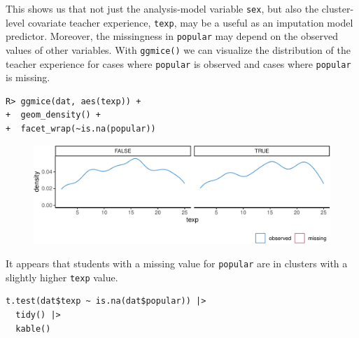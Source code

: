 \documentclass[
  article]{jss}
\begin{document}
This shows us that not just the analysis-model variable \texttt{sex},
but also the cluster-level covariate teacher experience, \texttt{texp},
may be a useful as an imputation model predictor. Moreover, the
missingness in \texttt{popular} may depend on the observed values of
other variables. With \texttt{ggmice()} we can visualize the
distribution of the teacher experience for cases where \texttt{popular}
is observed and cases where \texttt{popular} is missing.

\begin{verbatim}
R> ggmice(dat, aes(texp)) + 
+  geom_density() +
+  facet_wrap(~is.na(popular))
\end{verbatim}

\begin{figure}[h]

{\centering \includegraphics{manuscript_files/figure-pdf/unnamed-chunk-10-1.pdf}

}

\end{figure}

It appears that students with a missing value for \texttt{popular} are
in clusters with a slightly higher \texttt{texp} value.

\begin{verbatim}
t.test(dat$texp ~ is.na(dat$popular)) |> 
  tidy() |>
  kable()
\end{verbatim}
\end{document}
